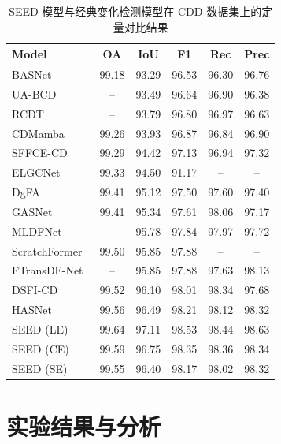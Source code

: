 \begin{table}[!htbp]
\centering
\caption{SEED 模型与经典变化检测模型在 CDD 数据集上的定量对比结果}
\label{tab:seed_cdd}
\begin{tabular}{lccccc}
\hline
\textbf{Model} & \textbf{OA} & \textbf{IoU} & \textbf{F1} & \textbf{Rec} & \textbf{Prec} \\
\hline
BASNet~\cite{z_wang_bitemporal_2024} & 99.18 & 93.29 & 96.53 & 96.30 & 96.76 \\  
UA-BCD~\cite{li_overcoming_2025}     & --    & 93.49 & 96.64 & 96.90 & 96.38 \\
RCDT~\cite{lu_cross_2024}                  & --    & 93.79 & 96.80 & 96.97 & 96.63 \\
CDMamba~\cite{zhang_cdmamba_2025}    & 99.26 & 93.93 & 96.87 & 96.84 & 96.90 \\
SFFCE-CD~\cite{y_xing_sffce-cd_2025}   & 99.29 & 94.42 & 97.13 & 96.94 &  97.32 \\
ELGCNet~\cite{m_noman_elgc-net_2024}   & 99.33  &  94.50   & 91.17  & --   & -- \\   
DgFA~\cite{f_zhou_dual-granularity_2025} & 99.41 & 95.12 & 97.50 & 97.60 & 97.40 \\
GASNet~\cite{zhang_global-aware_2023}  & 99.41  & 95.34  & 97.61  & 98.06  & 97.17 \\
MLDFNet~\cite{d_sidekejiang_mldfnet_2025}  & -- & 95.78 & 97.84 & 97.97 & 97.72 \\
ScratchFormer~\cite{Noman2023RemoteSC}   & 99.50 & 95.85  & 97.88 & -- & -- \\ 
FTransDF-Net~\cite{li_dual_2025}   & -- & 95.85 &  97.88 & 97.63 & 98.13 \\
DSFI-CD~\cite{x_li_dsfi-cd_2025}  & 99.52 & 96.10 &  98.01 & 98.34 & 97.68 \\
HASNet~\cite{c_tao_hasnet_2025}        & 99.56 & 96.49 & 98.21 & 98.12 & 98.32 \\
\hline
SEED (LE)                               & 99.64	& 97.11	& 98.53	& 98.44	& 98.63 \\
SEED (CE) & 99.59	& 96.75	& 98.35	& 98.36	& 98.34 \\
SEED (SE) & 99.55	& 96.40	& 98.17	& 98.02	& 98.32 \\
\hline
\end{tabular}
\end{table}


\section{实验结果与分析}

